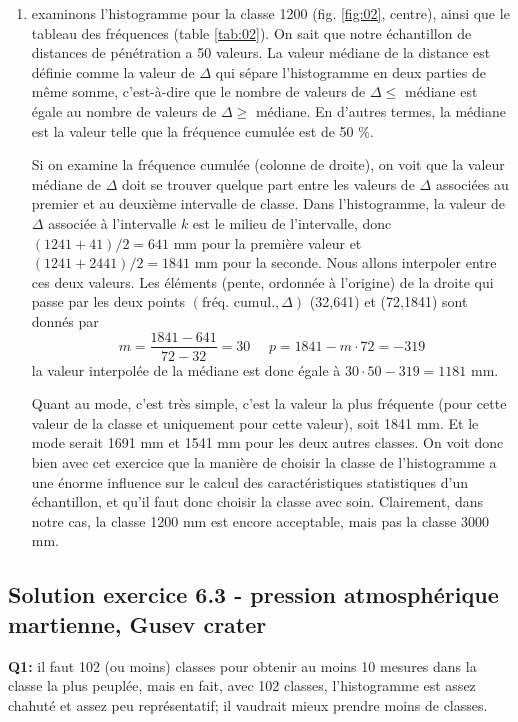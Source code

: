 \begin{enumerate}
\item examinons l'histogramme pour la classe 1200 (fig. \ref{fig:02}, centre), ainsi que le tableau des fréquences (table \ref{tab:02}). On sait que notre échantillon de distances de pénétration a 50 valeurs. La valeur médiane de la distance est définie comme la valeur de $\Delta$ qui sépare l'histogramme en deux parties de même somme, c'est-à-dire que le nombre de valeurs de $\Delta\le$ médiane est égale au nombre de valeurs de $\Delta\ge$ médiane. En d'autres termes, la médiane est la valeur telle que la fréquence cumulée est de 50 \%.

Si on examine la fréquence cumulée (colonne de droite), on voit que la valeur médiane de $\Delta$ doit se trouver quelque part entre les valeurs de $\Delta$ associées au premier et au deuxième intervalle de classe. Dans l'histogramme, la valeur de $\Delta$ associée à l'intervalle $k$ est le milieu de l'intervalle, donc $(1241+41)/2=641$ mm pour la première valeur et $(1241+2441)/2=1841$ mm pour la seconde. Nous allons interpoler entre ces deux valeurs. Les éléments (pente, ordonnée à l'origine) de la droite qui passe par les deux points $(\text{fréq. cumul.},\Delta)$ (32,641) et (72,1841) sont donnés par
$$
m=\frac{1841-641}{72-32}=30\ \ \ \ \ \ p=1841-m\cdot72=-319
$$
la valeur interpolée de la médiane est donc égale à $30\cdot50-319=1181$ mm.

Quant au mode, c'est très simple, c'est la valeur la plus fréquente (pour cette valeur de la classe et uniquement pour cette valeur), soit 1841 mm. Et le mode serait 1691 mm et 1541 mm pour les deux autres classes. On voit donc bien avec cet exercice que la manière de choisir la classe de l'histogramme a une énorme influence sur le calcul des caractéristiques statistiques d'un échantillon, et qu'il faut donc choisir la classe avec soin. Clairement, dans notre cas, la classe 1200 mm est encore acceptable, mais pas la classe 3000 mm.
\end{enumerate}

\subsection*{Solution exercice 6.3 - pression atmosphérique martienne, Gusev crater}

\textbf{Q1:} il faut 102 (ou moins) classes pour obtenir au moins 10 mesures dans la classe la plus peuplée, mais en fait, avec 102 classes, l'histogramme est assez chahuté et assez peu représentatif; il vaudrait mieux prendre moins de classes.

